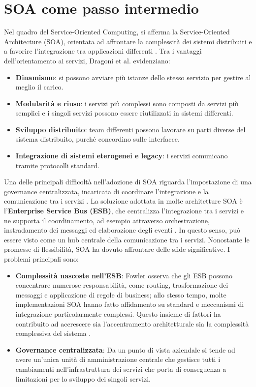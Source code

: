 \section{SOA come passo intermedio}
Nel quadro del Service-Oriented Computing, si afferma la Service-Oriented Architecture (SOA), orientata ad affrontare la complessità dei sistemi distribuiti e a favorire l’integrazione tra applicazioni differenti \cite{Dragoni2017}.
Tra i vantaggi dell’orientamento ai servizi, Dragoni et al. \cite{Dragoni2017} evidenziano:
\begin{itemize}
    \item \textbf{Dinamismo}: si possono avviare più istanze dello stesso servizio per gestire al meglio il carico.
    \item \textbf{Modularità e riuso}: i servizi più complessi sono composti da servizi più semplici e i singoli servizi possono essere riutilizzati in sistemi differenti.
    \item \textbf{Sviluppo distribuito}: team differenti possono lavorare su parti diverse del sistema distribuito, purché concordino sulle interfacce.
    \item \textbf{Integrazione di sistemi eterogenei e legacy}: i servizi comunicano tramite protocolli standard.
\end{itemize}

Una delle principali difficoltà nell’adozione di SOA riguarda l’impostazione di una governance centralizzata, incaricata di coordinare l’integrazione e la comunicazione tra i servizi \cite{Cerny2017SOAvsMicroservices}.
La soluzione adottata in molte architetture SOA è l’\textbf{Enterprise Service Bus (ESB)}, che centralizza l’integrazione tra i servizi e ne supporta il coordinamento, ad esempio attraverso orchestrazione, instradamento dei messaggi ed elaborazione degli eventi \cite{Cerny2017SOAvsMicroservices}. In questo senso, può essere visto come un hub centrale della comunicazione tra i servizi.
Nonostante le promesse di flessibilità, SOA ha dovuto affrontare delle sfide significative. I problemi principali sono: 
\begin{itemize}
    \item \textbf{Complessità nascoste nell'ESB}: Fowler osserva che gli ESB possono concentrare numerose responsabilità, come routing, trasformazione dei messaggi e applicazione di regole di business; allo stesso tempo, molte implementazioni SOA hanno fatto affidamento su standard e meccanismi di integrazione particolarmente complessi. Questo insieme di fattori ha contribuito ad accrescere sia l’accentramento architetturale sia la complessità complessiva del sistema \cite{Fowler2014}.
    \item \textbf{Governance centralizzata}: Da un punto di vista aziendale si tende ad avere un'unica unità di amministrazione centrale che gestisce tutti i cambiamenti nell'infrastruttura dei servizi che porta di conseguenza a limitazioni per lo sviluppo dei singoli servizi\cite{Cerny2017SOAvsMicroservices}.
\end{itemize}

